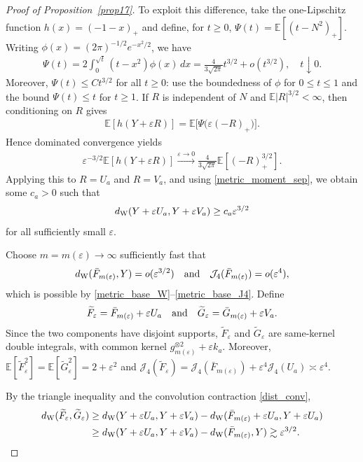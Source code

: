 \documentclass[letterpaper,11pt,reqno]{amsart}
\numberwithin{equation}{section}
\theoremstyle{plain}
\theoremstyle{definition}
\theoremstyle{remark}
\newcommand{\E}{\mathbb{E}}
\newcommand{\eps}{\varepsilon}
\newcommand{\noi}{\noindent}
\newcommand{\dd}{d}
\newcommand{\ot}{\otimes}
\newcommand{\Jfour}{\mathcal J_4}
\newcommand{\dW}{d_{\rm W}}
\newcommand{\AND}{\quad{\rm and}\quad}
\begin{document}
\begin{proof}[Proof of Proposition~\ref{prop17}]
To exploit this difference, take the one-Lipschitz function
$ h(x)=(-1-x)_+$
and define, for $t\geq0$,
$
 \Psi(t)=\E[(t-N^2)_+].
$
Writing $\phi(x)=(2\pi)^{-1/2}e^{-x^2/2}$, we have
\noi
\begin{align*}
 \Psi(t)=2\int_0^{\sqrt t}(t-x^2)\phi(x)\,\dd x
 =\frac{4}{3\sqrt{2\pi}}t^{3/2}+o(t^{3/2}),
 \quad t\downarrow0.
\end{align*}
Moreover, $\Psi(t)\leq Ct^{3/2}$ for all $t\geq0$: use the
boundedness of $\phi$ for $0\leq t\leq1$ and the bound
$\Psi(t)\leq t$ for $t\geq1$.  If $R$ is independent of $N$ and
$\E|R|^{3/2}<\infty$, then conditioning on $R$ gives
\noi
\begin{align*}
 \E[h(Y+\eps R)]
 =\E\bigl[\Psi\bigl(\eps(-R)_+\bigr)\bigr].
\end{align*}
Hence dominated convergence yields
\noi
\begin{align*}
 \eps^{-3/2}\E[h(Y+\eps R)]
 \xrightarrow{\eps\to0}
 \frac{4}{3\sqrt{2\pi}}
 \E[(-R)_+^{3/2}].
\end{align*}
Applying this to $R=U_a$ and $R=V_a$, and using
\eqref{metric_moment_sep}, we obtain some $c_a>0$ such that
\noi
\begin{align*}
 \dW(Y+\eps U_a,Y+\eps V_a)
 \geq c_a\eps^{3/2}
\end{align*}
for all sufficiently small $\eps$.

Choose $m=m(\eps)\to\infty$ sufficiently fast that
\noi
\begin{align*}
 \dW(\bar F_{m(\eps)},Y)
 =o(\eps^{3/2})
 \AND
 \Jfour(\bar F_{m(\eps)})
 =o(\eps^4),
\end{align*}
which is possible by
\eqref{metric_base_W}--\eqref{metric_base_J4}.  Define
\noi
\begin{align*}
 \widetilde F_\eps
 =
 \bar F_{m(\eps)}+\eps U_a
 \AND
 \widetilde G_\eps
 =
 \bar G_{m(\eps)}+\eps V_a.
\end{align*}
Since the two components have disjoint supports,
$\widetilde F_\eps$ and $\widetilde G_\eps$ are same-kernel double
integrals, with common kernel
$
 g_{m(\eps)}^{\ot2}+\eps k_a.
$
Moreover,
$
 \E[\widetilde F_\eps^2]
 =\E[\widetilde G_\eps^2]
 =2+\eps^2
$
and
$
 \Jfour(\widetilde F_\eps)
 =
 \Jfour(\bar F_{m(\eps)})
 +\eps^4\Jfour(U_a)
 \asymp\eps^4.
$

By the triangle inequality and the convolution contraction
\eqref{dist_conv},
\noi
\begin{align*}
 \dW(\widetilde F_\eps,\widetilde G_\eps)
 &\geq
 \dW(Y+\eps U_a,Y+\eps V_a)
 -\dW(\bar F_{m(\eps)}+\eps U_a,Y+\eps U_a)\\
 &\geq
 \dW(Y+\eps U_a,Y+\eps V_a)
 -\dW(\bar F_{m(\eps)},Y)
 \gtrsim\eps^{3/2}.
\end{align*}


\end{proof}
\end{document}
